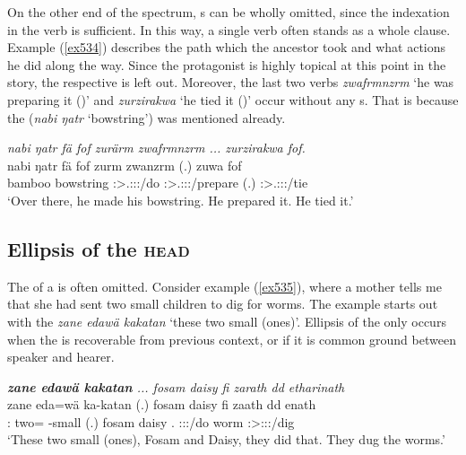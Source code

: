 On the other end of the spectrum, s can be wholly omitted, since the indexation in the verb is sufficient. In this way, a single verb often stands as a whole clause. Example (\ref{ex534}) describes the path which the ancestor took and what actions he did along the way. Since the protagonist is highly topical at this point in the story, the respective  is left out. Moreover, the last two verbs \emph{zwafrmnzrm} `he was preparing it (\F)' and \emph{zurzirakwa} `he tied it (\F)' occur without any s. That is because the   (\emph{nabi ŋatr} `bowstring') was mentioned already.

\begin{exe}
	\ex \emph{nabi ŋatr fä fof zurärm zwafrmnzrm ... zurzirakwa fof.}\\
	\gll nabi ŋatr fä fof zurm zwanzrm (.) zuwa fof\\
	bamboo bowstring \Dist{} \Emph{} \Sg:\Sbj>\Tsg.\F:\Obj:\Pst:\Dur/do \Sg:\Sbj>\Tsg.\F:\Obj:\Pst:\Dur/prepare (.) \Sg:\Sbj>\Tsg.\F:\Obj:\Pst:\Ipfv/tie \Emph{}\\
	\trans `Over there, he made his bowstring. He prepared it. He tied it.'\\
	\label{ex534}
\end{exe}

\subsection{Ellipsis of the \textsc{head}}\label{headellipsis}

The  of a  is often omitted. Consider example (\ref{ex535}), where a mother tells me that she had sent two small children to dig for worms. The example starts out with the  \emph{zane edawä kakatan} `these two small (ones)'. Ellipsis of the  only occurs when the  is recoverable from previous context, or if it is common ground between speaker and hearer.

\begin{exe}
	\ex \emph{\textbf{zane edawä kakatan} ... fosam daisy fi zarath dd etharinath}\\
	\gll zane eda=wä ka-katan (.) fosam daisy fi zaath dd enath\\
	\Dem:\Prox{} two=\Emph{} \Redup-small (.) fosam daisy \Third.\Abs{} \Stdu:\Sbj:\Pst:\Pfv/do worm \Stdu:\Sbj>\Stpl:\Obj:\Pst:\Ipfv/dig\\
	\trans `These two small (ones), Fosam and Daisy, they did that. They dug the worms.'
	\label{ex535}
\end{exe}

